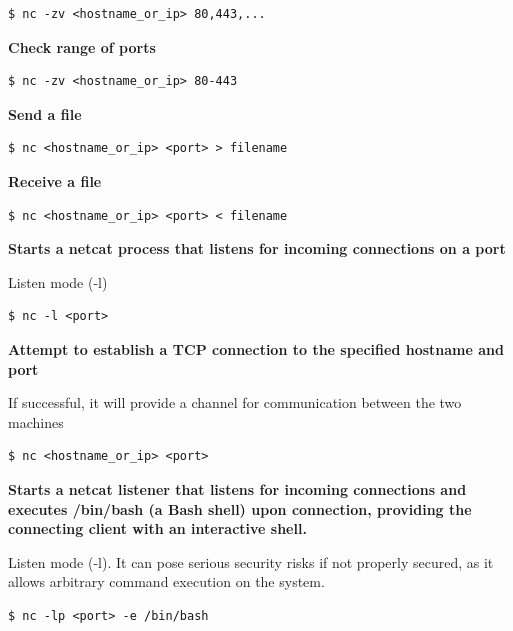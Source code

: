 \documentclass{article}
\newenvironment{codetemplate}[1][]{%
  \mybasecolorbox[#1]
  \itshape
}{%
  \endmybasecolorbox
}
\begin{document}
\begin{codetemplate}
\begin{verbatim}
$ nc -zv <hostname_or_ip> 80,443,...
\end{verbatim}
\end{codetemplate}


\textbf{Check range of ports}
\begin{codetemplate}{}
\begin{verbatim}
$ nc -zv <hostname_or_ip> 80-443
\end{verbatim}
\end{codetemplate}

\textbf{Send a file}
\begin{codetemplate}{}
\begin{verbatim}
$ nc <hostname_or_ip> <port> > filename
\end{verbatim}
\end{codetemplate}

\textbf{Receive a file}
\begin{codetemplate}{}
\begin{verbatim}
$ nc <hostname_or_ip> <port> < filename
\end{verbatim}
\end{codetemplate}

\textbf{Starts a netcat process that listens for incoming connections on a port}

Listen mode (-l)
\begin{codetemplate}{}
\begin{verbatim}
$ nc -l <port>
\end{verbatim}
\end{codetemplate}

\textbf{Attempt to establish a TCP connection to the specified hostname and port}

If successful, it will provide a channel for communication between the two machines
\begin{codetemplate}{}
\begin{verbatim}
$ nc <hostname_or_ip> <port>
\end{verbatim}
\end{codetemplate}

\textbf{Starts a netcat listener that listens for incoming connections and executes /bin/bash (a Bash shell) upon connection, providing the connecting client with an interactive shell.}

Listen mode (-l). It can pose serious security risks if not properly secured, as it allows arbitrary command execution on the system. 
\begin{codetemplate}{}
\begin{verbatim}
$ nc -lp <port> -e /bin/bash
\end{verbatim}
\end{codetemplate}
\end{document}
